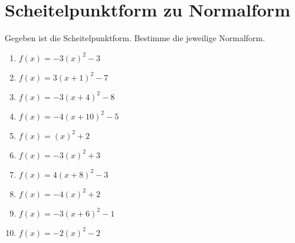 \documentclass{article}%
\begin{document}
\section{Scheitelpunktform zu Normalform}%
\label{sec:ScheitelpunktformzuNormalform}%
Gegeben ist die Scheitelpunktform. Bestimme die jeweilige Normalform.%
\begin{enumerate}[label=\alph*)]%
\item%
\newline\vspace{0.5cm} $f(x)=-3(x)^2 -3$%
\item%
\newline\vspace{0.5cm} $f(x)=3(x+1)^2 -7$%
\item%
\newline\vspace{0.5cm} $f(x)=-3(x+4)^2 -8$%
\item%
\newline\vspace{0.5cm} $f(x)=-4(x+10)^2 -5$%
\item%
\newline\vspace{0.5cm} $f(x)=(x)^2 +2$%
\item%
\newline\vspace{0.5cm} $f(x)=-3(x)^2 +3$%
\item%
\newline\vspace{0.5cm} $f(x)=4(x+8)^2 -3$%
\item%
\newline\vspace{0.5cm} $f(x)=-4(x)^2 +2$%
\item%
\newline\vspace{0.5cm} $f(x)=-3(x+6)^2 -1$%
\item%
\newline\vspace{0.5cm} $f(x)=-2(x)^2 -2$%
\end{enumerate}

%
\end{document}
